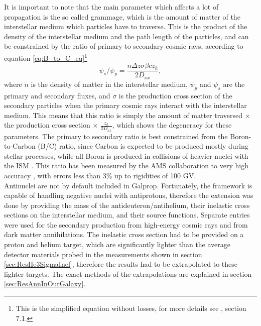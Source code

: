 It is important to note that the main parameter which affects a lot of propagation is the so called grammage, which is the amount of matter of the interstellar medium which particles have to traverse. This is the product of the density of the interstellar medium and the path length of the particles, and can be constrained by the ratio of primary to secondary cosmic rays, according to equation \ref{eq:B_to_C_eq}\footnote{This is the simplified equation without losses, for more details see \cite{GALPROP_Expl_Supplement}, section 7.1.}
\begin{equation}
    \psi_s / \psi_p = \frac{n\Delta z \sigma \beta c z_h}{2D_{xx}},
    \label{eq:B_to_C_eq}
\end{equation}
where $n$ is the density of matter in the interstellar medium, $\psi_p$ and $\psi_s$ are the primary and secondary fluxes, and $\sigma$ is the production cross section of the secondary particles when the primary cosmic rays interact with the interstellar medium. This means that this ratio is simply the amount of matter traversed $\times$ the production cross section $\times$ $\frac{z_h}{2D_{xx}}$, which shows the degeneracy for these parameters. The primary to secondary ratio is best constrained from the Boron-to-Carbon (B/C) ratio, since Carbon is expected to be produced mostly during stellar processes, while all Boron is produced in collisions of heavier nuclei with the ISM \cite{AMS_B_to_C}. This ratio has been measured by the AMS collaboration to very high accuracy \cite{AMS_B_to_C}, with errors less than 3\% up to rigidities of 100 GV.\\

Antinuclei are not by default included in Galprop. Fortunately, the framework is capable of handling negative nuclei with antiprotons, therefore the extension was done by providing the mass of the antideuteron/antihelium, their inelastic cross sections on the interstellar medium, and their source functions. Separate entries were used for the secondary production from high-energy cosmic rays and from dark matter annihilations. The inelastic cross section had to be provided on a proton and helium target, which are significantly lighter than the average detector materials probed in the measurements shown in section \ref{sec:ResHe3SigmaInel}, therefore the results had to be extrapolated to these lighter targets. The exact methods of the extrapolations are explained in section \ref{sec:ResAnnInOurGalaxy}.\\


